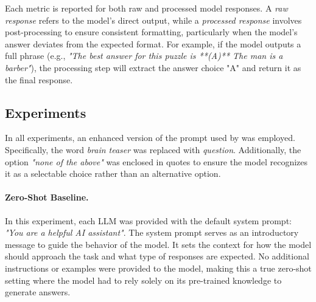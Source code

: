 Each metric is reported for both raw and processed model responses. A \textit{raw response} refers to the model's direct output, while a \textit{processed response} involves post-processing to ensure consistent formatting, particularly when the model's answer deviates from the expected format. For example, if the model outputs a full phrase (e.g., \textit{"The best answer for this puzzle is **(A)** The man is a barber"}), the processing step will extract the answer choice "A" and return it as the final response.

\subsection{Experiments}

In all experiments, an enhanced version of the prompt used by \textcite{jiangBRAINTEASERLateralThinking2023} was employed. Specifically, the word \textit{brain teaser} was replaced with \textit{question}. Additionally, the option \textit{"none of the above"} was enclosed in quotes to ensure the model recognizes it as a selectable choice rather than an alternative option.



\paragraph{Zero-Shot Baseline.}
In this experiment, each \ac{LLM} was provided with the default system prompt: \textit{"You are a helpful AI assistant"}. The system prompt serves as an introductory message to guide the behavior of the model. It sets the context for how the model should approach the task and what type of responses are expected. No additional instructions or examples were provided to the model, making this a true zero-shot setting where the model had to rely solely on its pre-trained knowledge to generate answers.

